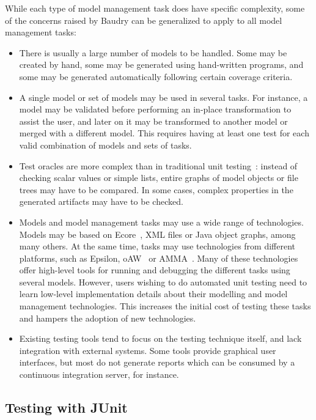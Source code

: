 While each type of model management task does have specific complexity, some of the concerns raised by Baudry can be generalized to apply to all model management tasks:
\begin{itemize}
\item There is usually a large number of models to be handled. Some may be created by hand, some may be generated using hand-written programs, and some may be generated automatically following certain coverage criteria.

\item A single model or set of models may be used in several tasks. For instance, a model may be validated before performing an in-place transformation to assist the user, and later on it may be transformed to another model or merged with a different model. This requires having at least one test for each valid combination of models and sets of tasks.

\item Test oracles are more complex than in traditional unit testing~\cite{Mottu2008}: instead of checking scalar values or simple lists, entire graphs of model objects or file trees may have to be compared. In some cases, complex properties in the generated artifacts may have to be checked.

\item Models and model management tasks may use a wide range of technologies. Models may be based on Ecore~\cite{Steinberg2008}, XML files or Java object graphs, among many others. At the same time, tasks may use technologies from different platforms, such as Epsilon, oAW~\cite{oAW} or AMMA~\cite{AMMA}. Many of these technologies offer high-level tools for running and debugging the different tasks using several models. However, users wishing to do automated unit testing need to learn low-level implementation details about their modelling and model management technologies. This increases the initial cost of testing these tasks and hampers the adoption of new technologies.

\item Existing testing tools tend to focus on the testing technique itself, and lack integration with external systems. Some tools provide graphical user interfaces, but most do not generate reports which can be consumed by a continuous integration server, for instance.
\end{itemize}

\subsection{Testing with JUnit}
\label{sec:testing-with-junit}

